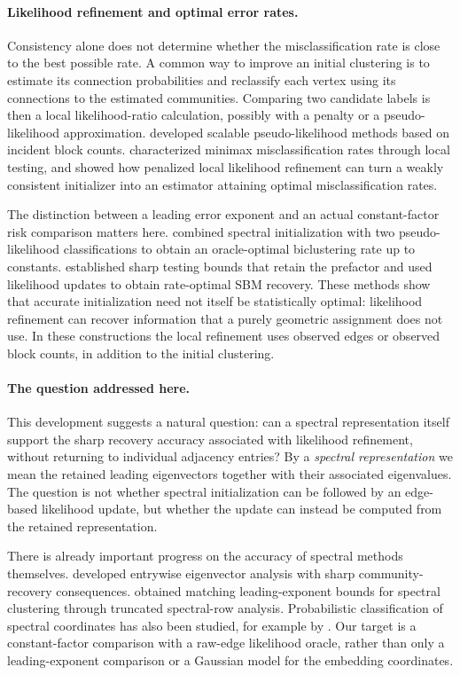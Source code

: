 \paragraph{Likelihood refinement and optimal error rates.}
Consistency alone does not determine whether the misclassification
rate is close to the best possible rate. A common way to improve an
initial clustering is to estimate its connection probabilities and
reclassify each vertex using its connections to the estimated
communities. Comparing two candidate labels is then a local
likelihood-ratio calculation, possibly with a penalty or a
pseudo-likelihood approximation. \citet{amini2013} developed scalable pseudo-likelihood methods
based on incident block counts. \citet{zhangzhou2016}
characterized minimax misclassification rates through local testing,
and \citet{gao2017} showed how penalized
local likelihood refinement can turn a weakly consistent initializer
into an estimator attaining optimal misclassification rates.

The distinction between a leading error exponent and an actual
constant-factor risk comparison matters here. \citet{zhouamini2020} combined spectral initialization with two
pseudo-likelihood classifications to obtain an oracle-optimal
biclustering rate up to constants. \citet{zhouli}
established sharp testing bounds that retain the prefactor and used
likelihood updates to obtain rate-optimal SBM recovery. These methods
show that accurate initialization need not itself be statistically
optimal: likelihood refinement can recover information that a purely
geometric assignment does not use. In these constructions the local
refinement uses observed edges or observed block counts, in addition
to the initial clustering.

\paragraph{The question addressed here.}
This development suggests a natural question: can a spectral
representation itself support the sharp recovery accuracy associated
with likelihood refinement, without returning to individual adjacency
entries? By a \emph{spectral representation} we mean the retained
leading eigenvectors together with their associated eigenvalues.
The question is not whether spectral initialization can be followed by
an edge-based likelihood update, but whether the update can instead
be computed from the retained representation.

There is already important progress on the accuracy of spectral
methods themselves. \citet{afwz} developed
entrywise eigenvector analysis with sharp community-recovery
consequences. \citet{zhang} obtained matching leading-exponent
bounds for spectral clustering through truncated spectral-row
analysis. Probabilistic classification of spectral coordinates has
also been studied, for example by \citet{suwan2016}. Our target is a constant-factor comparison
with a raw-edge likelihood oracle, rather than only a leading-exponent
comparison or a Gaussian model for the embedding coordinates.

